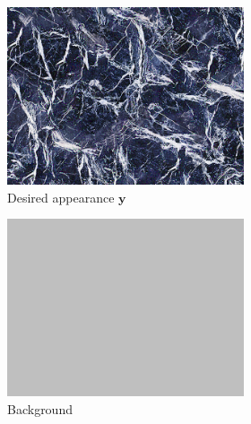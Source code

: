 \begin{figure}[]
\begin{subfigure}{\textwidth}
        \begin{subfigure}{0.19\textwidth}
            \centering
            \includegraphics[width=\textwidth]{images/04-experiment02/isolating_issues/target.jpg}
            \caption*{Desired appearance \(\bm{y}\)}
        \end{subfigure}
        \hfill
        \begin{subfigure}{0.19\textwidth}
            \centering
            \includegraphics[width=\textwidth]{images/04-experiment02/isolating_issues/190_bg.jpg}
            \caption*{Background}
            \vspace*{5mm}
        \end{subfigure}
        \hfill
        \begin{subfigure}{0.6\textwidth}

\end{subfigure}
\end{subfigure}
\end{figure}
